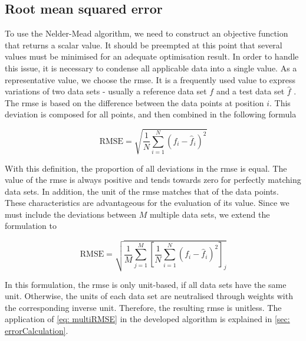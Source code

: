 \subsection{Root mean squared error} \label{subsec: RMSE}
To use the Nelder-Mead algorithm, we need to construct an objective function that returns a scalar value. It should be preempted at this point that several values must be minimised for an adequate optimisation result. In order to handle this issue, it is necessary to condense all applicable data into a single value. As a representative value, we choose the \acrfull{rmse}. It is a frequently used value to express variations of two data sets - usually a reference data set $f$ and a test data set $\hat{f}$ \cite{morrow_method_2010}. The \acrshort{rmse} is based on the difference between the data points at position $i$. This deviation is composed for all points, and then combined in the following formula

\begin{equation} \label{eq: RMSE}
    \text{RMSE} = \sqrt{\frac{1}{N}\sum_{i=1}^{N} (f_i - \hat{f}_i)^2}
\end{equation}

With this definition, the proportion of all deviations in the \acrshort{rmse} is equal. The value of the \acrshort{rmse} is always positive and tends towards zero for perfectly matching data sets. In addition, the unit of the \acrshort{rmse} matches that of the data points. These characteristics are advantageous for the evaluation of its value. Since we must include the deviations between $M$ multiple data sets, we extend the formulation to 

\begin{equation} \label{eq: multiRMSE}
    \text{RMSE} = \sqrt{\frac{1}{M} \sum_{j=1}^{M} \left[ \frac{1}{N} \sum_{i=1}^{N} (f_i - \hat{f}_i)^2 \right] _j}
\end{equation}

In this formulation, the \acrshort{rmse} is only unit-based, if all data sets have the same unit. Otherwise, the units of each data set are neutralised through weights with the corresponding inverse unit. Therefore, the resulting \acrshort{rmse} is unitless. The application of \autoref{eq: multiRMSE} in the developed algorithm is explained in \autoref{sec: errorCalculation}. 


